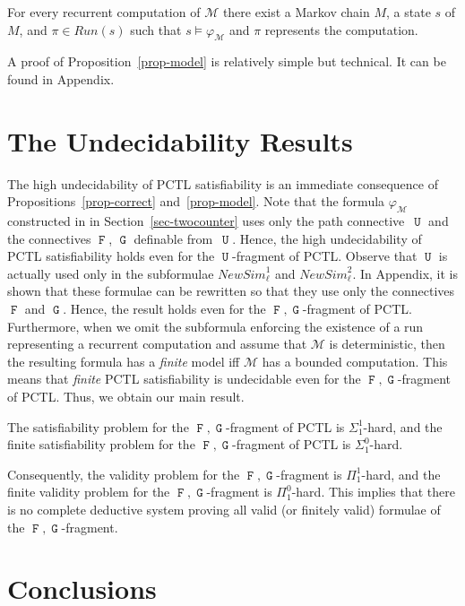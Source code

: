 \documentclass[a4paper,UKenglish,cleveref, autoref, thm-restate]{lipics-v2021}
\newcommand{\M}{\mathcal{M}}
\newcommand{\run}{\textit{Run}}
\newcommand{\NewSimulate}{\mathit{NewSim}}
\newcommand{\fp}{Appendix}
\newcommand*{\opu}{\operatorname{\pmb{\mathtt{U}}}}
\newcommand*{\opf}{\operatorname{\pmb{\mathtt{F}}}}
\newcommand*{\opg}{\operatorname{\pmb{\mathtt{G}}}}
\begin{document}
\begin{proposition}
\label{prop-model}
    For every recurrent computation of $\M$ there exist a Markov chain $M$, a state $s$ of $M$, and $\pi \in \run(s)$ such that $s \models \varphi_\M$ and $\pi$ represents the computation.
\end{proposition}
A proof of Proposition~\ref{prop-model} is relatively simple but technical. 
It can be found in \fp.
 
\section{The Undecidability Results}

The high undecidability of PCTL satisfiability is an immediate consequence of Propositions~\ref{prop-correct} and~\ref{prop-model}. Note that the 
formula $\varphi_\M$ constructed in in Section~\ref{sec-twocounter} uses only the path connective~$\opu$ and the connectives $\opf$, $\opg$ definable from~$\opu$. Hence, the high undecidability of PCTL satisfiability holds even for the $\opu$-fragment of PCTL. Observe that $\opu$ is actually used only in the subformulae $\NewSimulate_\ell^1$ and $\NewSimulate_\ell^2$. In \fp, it is shown that these formulae can be rewritten so that they use only the connectives $\opf$ and $\opg$. Hence, the result holds even for the $\opf,\opg$-fragment of PCTL.
Furthermore, when we omit the subformula enforcing the existence of a run representing a recurrent computation and assume that $\M$ is deterministic, then the resulting formula has a \emph{finite} model iff $\M$ has a bounded computation. This means that \emph{finite} PCTL satisfiability is undecidable even for the $\opf,\opg$-fragment of PCTL. Thus, we obtain our main result.

\begin{theorem}   
The satisfiability problem for the $\opf,\opg$-fragment of PCTL is $\Sigma_1^1$-hard, and the finite satisfiability problem for the $\opf,\opg$-fragment of PCTL is $\Sigma_1^0$-hard. 
\end{theorem}
Consequently, the validity problem for the $\opf,\opg$-fragment is $\Pi_1^1$-hard, and the finite validity problem for the $\opf,\opg$-fragment is $\Pi_1^0$-hard. This implies that there is no complete deductive system proving all valid (or finitely valid) formulae of the $\opf,\opg$-fragment.


\section{Conclusions}
\end{document}
